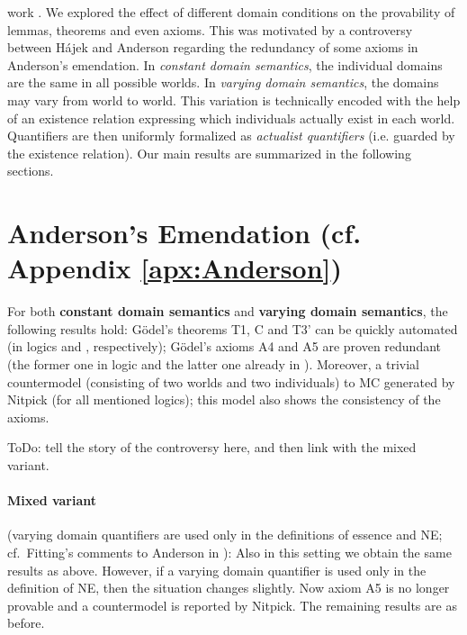 \documentclass{birkjour}
\theoremstyle{definition}
\theoremstyle{remark}
\numberwithin{equation}{section}
\begin{document}
work \cite{C40,J30,J23}. We explored the effect of different domain conditions
 on the provability of lemmas, theorems and even axioms. This was motivated by a controversy between Hájek and Anderson regarding the redundancy of some axioms in Anderson's emendation. In \emph{constant domain semantics}, the individual domains are the same in all possible worlds. In \emph{varying domain semantics}, the domains may vary from world to world. This variation is technically encoded with the help of an existence relation expressing which individuals actually exist in each world. Quantifiers are then uniformly formalized as \emph{actualist quantifiers} (i.e. guarded by the existence relation). Our main results are summarized in the following sections.


\section{Anderson's Emendation (cf. Appendix \ref{apx:Anderson})}


For both \textbf{constant domain semantics} and \textbf{varying domain semantics}, the following results hold: 
%
G\"odel's theorems T1, C and T3' can be quickly automated (in logics \K and \KB, respectively); 
%
G\"odel's axioms A4 and A5 are proven redundant (the former one in
  logic \KFourB and the latter one already in \K).
%
Moreover, a trivial countermodel (consisting of two worlds and 
two individuals) to MC generated by Nitpick (for all mentioned logics); this model also shows the consistency of the axioms. 

ToDo: tell the story of the controversy here, and then link with the mixed variant. 



\paragraph{Mixed variant}
(varying domain
  quantifiers are used only in the definitions of essence and NE;
  cf.~Fitting's comments to Anderson in
  \cite{fitting02:_types_tableaus_god}): Also in this setting we
  obtain the same results as above. However, if a varying domain
  quantifier is used only in the definition of NE, then the
  situation changes slightly. Now axiom A5 is no longer provable and
  a countermodel is reported by Nitpick. The remaining results are as before.
\end{document}
